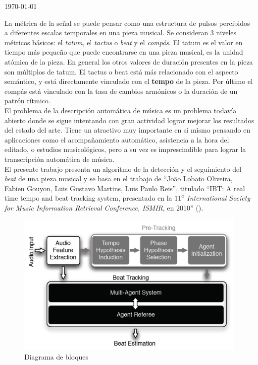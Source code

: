 \documentclass[12pt,a4paper,titlepage]{report}
\begin{document}
\begin{titlepage}
\begin{center}
{\large \today}
\end{center}
\end{titlepage}




La métrica de la señal se puede pensar como una estructura de pulsos percibidos a diferentes escalas temporales en una pieza musical. Se consideran 3 niveles métricos básicos: el \emph{tatum}, el \emph{tactus} o \emph{beat} y el \emph{compás}. El tatum es el valor en tiempo más pequeño que puede encontrarse en una pieza musical, es la unidad atómica de la pieza. En general los otros valores de duración presentes en la pieza son múltiplos de tatum. El tactus o beat está más relacionado con el aspecto semántico, y está directamente vinculado con el \textbf{tempo} de la pieza. Por último el compás está vinculado con la tasa de cambios armónicos o la duración de un patrón rítmico.\\

El problema de la descripción automática de música es un problema todavía abierto donde se sigue intentando con gran actividad lograr mejorar los resultados del estado del arte. Tiene un atractivo muy importante en sí mismo pensando en aplicaciones como el acompañamiento automático, asistencia a la hora del editado, o estudios musicológicos, pero a su vez es imprescindible para lograr la transcripción automática de música.\\

El presente trabajo presenta un algoritmo de la detección y el seguimiento del \emph{beat} de una pieza musical y se basa en el trabajo de ``Jo\~ao Lobato Oliveira, Fabien Gouyon, Luis Gustavo Martins, Luis Paulo Reis'', titulado ``IBT: A real time tempo and beat tracking system, presentado en la \emph{$11^a$ International Society for Music Information Retrieval Conference, ISMIR}, en 2010'' (\cite{bib:el_posta}).


\vspace{15pt}
\begin{figure}[h!]
  \begin{center}
  \includegraphics[width=1\textwidth]{./pics/bloques.png}
  \end{center}
  \vspace{-10pt}
  \caption{Diagrama de bloques}
  \label{fig:bloques}
\end{figure}
\end{document}
